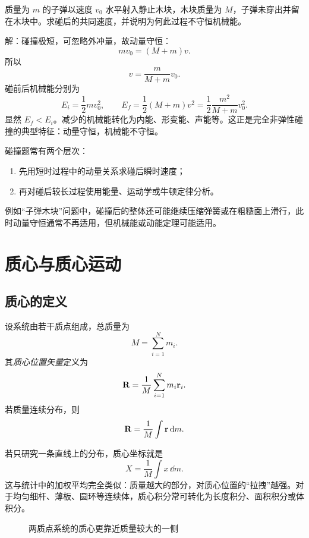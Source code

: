 \begin{example}
质量为 $m$ 的子弹以速度 $v_0$ 水平射入静止木块，木块质量为 $M$，子弹未穿出并留在木块中。求碰后的共同速度，并说明为何此过程不守恒机械能。

解：碰撞极短，可忽略外冲量，故动量守恒：
\[
mv_0=(M+m)v.
\]
所以
\[
v=\frac{m}{M+m}v_0.
\]
碰前后机械能分别为
\[
E_i=\frac12 mv_0^2,
\qquad
E_f=\frac12 (M+m)v^2=\frac12\frac{m^2}{M+m}v_0^2.
\]
显然 $E_f<E_i$。减少的机械能转化为内能、形变能、声能等。这正是完全非弹性碰撞的典型特征：动量守恒，机械能不守恒。
\end{example}

\begin{remark}
碰撞题常有两个层次：
\begin{enumerate}
  \item 先用短时过程中的动量关系求碰后瞬时速度；
  \item 再对碰后较长过程使用能量、运动学或牛顿定律分析。
\end{enumerate}
例如“子弹木块”问题中，碰撞后的整体还可能继续压缩弹簧或在粗糙面上滑行，此时动量守恒通常不再适用，但机械能或动能定理可能适用。
\end{remark}

\section{质心与质心运动}

\subsection{质心的定义}

\begin{definition}
设系统由若干质点组成，总质量为
\[
M=\sum_{i=1}^N m_i.
\]
其\emph{质心位置矢量}定义为
\[
\vb R=\frac{1}{M}\sum_{i=1}^N m_i\vb r_i.
\]
若质量连续分布，则
\[
\vb R=\frac{1}{M}\int \vb r\,\dd m.
\]
\end{definition}

若只研究一条直线上的分布，质心坐标就是
\[
X=\frac{1}{M}\int x\,\dd m.
\]
这与统计中的加权平均完全类似：质量越大的部分，对质心位置的“拉拽”越强。对于均匀细杆、薄板、圆环等连续体，质心积分常可转化为长度积分、面积积分或体积分。

\begin{figure}[H]
\centering
{}
\caption{两质点系统的质心更靠近质量较大的一侧}
\end{figure}


